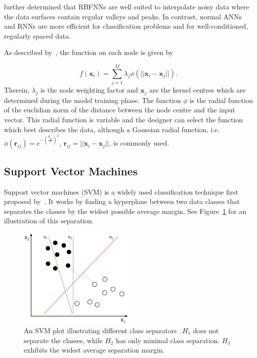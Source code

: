\citeauthor{xie2011comparison} further determined that RBFNNs are well suited to interpolate noisy data where the data surfaces contain regular valleys and peaks. In contrast, normal ANNs and RNNs are more efficient for classification problems and for well-conditioned, regularly spaced data. 

As described by~\cite{skala2012radial}, the function on each node is given by 

\begin{equation}
  \label{eq:chap2-rbf}
  f(\bm{x}_i) = \sum\limits_{j = 1}^{M}\lambda_j \phi(|| \bm{x}_i - \bm{x}_j ||).
\end{equation}
Therein, $\lambda_j$ is the node weighting factor and $\bm{x}_j$ are the kernel centres which are determined during the model training phase. The function $\phi$ is the radial function of the euclidian norm of the distance between the node centre and the input vector. This radial function is variable and the designer can select the function which best describes the data, although a Gaussian radial function, i.e.\ $\phi(\bm{r}_{ij}) = e^{-(\frac{\bm{r}_{ij}}{\epsilon})^2}$, $\bm{r}_{ij} = || \bm{x}_i - \bm{x}_j ||$, is commonly used.  

\subsection{Support Vector Machines}

Support vector machines (SVM) is a widely used classification technique first proposed by~\cite{vapnik1995support}. It works by finding a hyperplane between two data classes that separates the classes by the widest possible average margin. See Figure~\ref{fig:chap2-svm-linear} for an illustration of this separation.

\begin{figure}
  \centering
  \includegraphics[width=0.5\textwidth]{figures/chapter2/svm_linear}
  \caption[SVM with a linear hyperplane.]{An SVM plot illustrating different class separators~\citep{svm-wiki-pic}.\@ $H_1$ does not separate the classes, while $H_2$ has only minimal class separation. $H_3$ exhibits the widest average separation margin.}
\label{fig:chap2-svm-linear}
\end{figure}

